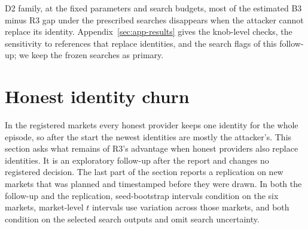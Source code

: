 \documentclass[11pt]{article}
\begin{document}
D2 family, at the fixed parameters and search budgets, most of the estimated B3 minus R3 gap under the prescribed searches disappears when the attacker cannot replace its identity. Appendix~\ref{sec:app-results} gives the knob-level checks, the sensitivity to references that replace identities, and the search flags of this follow-up; we keep the frozen searches as primary.
\begin{table}[t]\centering\small
{}
\caption{Exploratory follow-up, after the report: the difference between the two prescribed searches, $I = g(\mathrm{D2{+}H3}) - g(\mathrm{D2})$, per rule, its contrasts, the B3 minus R3 gaps $G$ under each family, and the share $S$, pooled over the six fresh markets with equal weights, with paired seed-bootstrap percentile intervals; frozen and doubled searches. $S$ is shown only when the lower bound of the pooled D2+H3 gap exceeds the preset floor. The lower block gives the gaps per market (D2+H3 / D2).}\label{tab:ph-reset}
\end{table}


\section{Honest identity churn}\label{sec:churn}
In the registered markets every honest provider keeps one identity for the whole episode, so after the start the newest identities are mostly the attacker's. This section asks what remains of R3's advantage when honest providers also replace identities. It is an exploratory follow-up after the report and changes no registered decision. The last part of the section reports a replication on new markets that was planned and timestamped before they were drawn. In both the follow-up and the replication, seed-bootstrap intervals condition on the six markets, market-level $t$ intervals use variation across those markets, and both condition on the selected search outputs and omit search uncertainty.
\end{document}
